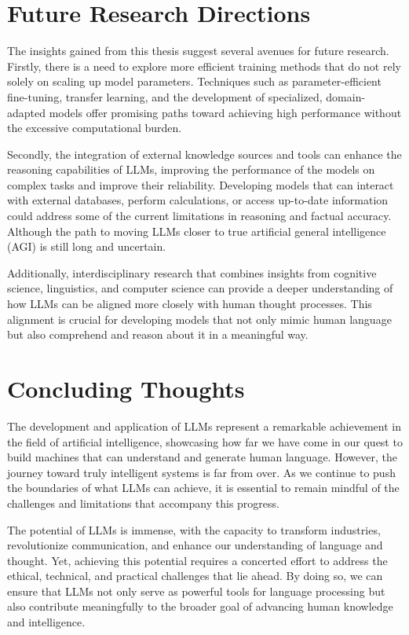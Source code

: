 \section*{Future Research Directions}
The insights gained from this thesis suggest several avenues for future research.
Firstly, there is a need to explore more efficient training methods that do not rely solely on scaling up model parameters.
Techniques such as parameter-efficient fine-tuning, transfer learning, and the development of specialized, domain-adapted models offer promising paths toward achieving high performance without the excessive computational burden.

Secondly, the integration of external knowledge sources and tools can enhance the reasoning capabilities of LLMs, improving the performance of the models on complex tasks and improve their reliability.
Developing models that can interact with external databases, perform calculations, or access up-to-date information could address some of the current limitations in reasoning and factual accuracy.
Although the path to moving LLMs closer to true artificial general intelligence (AGI) is still long and uncertain.

Additionally, interdisciplinary research that combines insights from cognitive science, linguistics, and computer science can provide a deeper understanding of how LLMs can be aligned more closely with human thought processes.
This alignment is crucial for developing models that not only mimic human language but also comprehend and reason about it in a meaningful way.

\section*{Concluding Thoughts}
The development and application of LLMs represent a remarkable achievement in the field of artificial intelligence, showcasing how far we have come in our quest to build machines that can understand and generate human language.
However, the journey toward truly intelligent systems is far from over.
As we continue to push the boundaries of what LLMs can achieve, it is essential to remain mindful of the challenges and limitations that accompany this progress.

The potential of LLMs is immense, with the capacity to transform industries, revolutionize communication, and enhance our understanding of language and thought.
Yet, achieving this potential requires a concerted effort to address the ethical, technical, and practical challenges that lie ahead.
By doing so, we can ensure that LLMs not only serve as powerful tools for language processing but also contribute meaningfully to the broader goal of advancing human knowledge and intelligence.